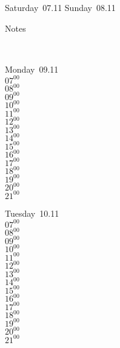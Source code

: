 \documentclass[11pt,a4paper]{book}\usepackage[]{graphicx}\usepackage[]{color}
\begin{document}
{{{{{{{{{{{{{{{{{{{\begin{tcolorbox}
\end{tcolorbox} 
\begin{tcolorbox}[height=(\textheight-10mm)/6]
Saturday~07.11
\tcblower
Sunday~08.11
\end{tcolorbox} %
\begin{tcolorbox}[height=(\textheight-10mm)/6,sidebyside=false]
Notes
\end{tcolorbox}
\clearpage
\vspace{2 mm}\\
\begin{tcolorbox}
Monday~09.11\\
{ 
  $07^{00}$\\
$08^{00}$\\
$09^{00}$\\
$10^{00}$\\
$11^{00}$\\
$12^{00}$\\
$13^{00}$\\
$14^{00}$\\
$15^{00}$\\
$16^{00}$\\
$17^{00}$\\
$18^{00}$\\
$19^{00}$\\
$20^{00}$\\
$21^{00}$}\\

\end{tcolorbox}
\begin{tcolorbox}
Tuesday~10.11\\
{ 
  $07^{00}$\\
$08^{00}$\\
$09^{00}$\\
$10^{00}$\\
$11^{00}$\\
$12^{00}$\\
$13^{00}$\\
$14^{00}$\\
$15^{00}$\\
$16^{00}$\\
$17^{00}$\\
$18^{00}$\\
$19^{00}$\\
$20^{00}$\\
$21^{00}$}\\


\end{tcolorbox}}}}}}}}}}}}}}}}}}}}
\end{document}
